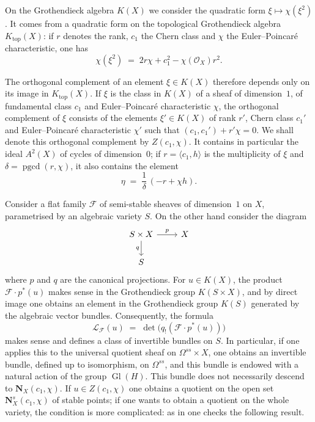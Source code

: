 \documentclass[12pt,english]{smfart}%
\theoremstyle{plain}
\theoremstyle{definition}
\theoremstyle{remark}
\newcommand{\Oh}{\mathcal{O}}
\DeclareMathOperator{\Gl}{Gl}
\newcommand{\gcdd}{\operatorname{pgcd}}
\newcommand{\origpage}[1]{\marginnote{\scriptsize\itshape p.~#1}}
\begin{document}
On the Grothendieck algebra $K(X)$ we consider the quadratic form $\xi\mapsto\chi(\xi^{2})$. It comes from a quadratic form on the topological Grothendieck algebra $K_{\mathrm{top}}(X)$: if $r$ denotes the rank, $c_{1}$ the Chern class and $\chi$ the Euler--Poincar\'e characteristic, one has
\[
\chi(\xi^{2}) \;=\; 2r\chi + c_{1}^{2} - \chi(\Oh_{X})r^{2}.
\]

The orthogonal complement of an element $\xi\in K(X)$ therefore depends only on its image in $K_{\mathrm{top}}(X)$. If $\xi$ is the class in $K(X)$ of a sheaf of dimension~$1$, of fundamental class $c_{1}$ and Euler--Poincar\'e characteristic $\chi$, the orthogonal complement of $\xi$ consists of the elements $\xi'\in K(X)$ of rank $r'$, Chern class $c_{1}'$ and Euler--Poincar\'e characteristic $\chi'$ such that $(c_{1},c_{1}')+r'\chi=0$. We shall denote this orthogonal complement by $Z(c_{1},\chi)$. It contains in particular the ideal $A^{2}(X)$ of cycles of dimension~$0$; if $r=\langle c_{1},h\rangle$ is the multiplicity of $\xi$ and $\delta=\gcdd(r,\chi)$, it also contains the element
\[
\eta \;=\; \frac{1}{\delta}\,(-r + \chi h).
\]

Consider a flat family $\mathscr{F}$ of semi-stable sheaves of dimension~$1$ on $X$, parametrised by an algebraic variety $S$. On the other hand consider the diagram
\[
\begin{tikzcd}
S\times X \arrow[r,"p"] \arrow[d,"q"'] & X \\
S &
\end{tikzcd}
\]
where $p$ and $q$ are the canonical projections. For $u\in K(X)$, the product $\mathscr{F}\cdot p^{*}(u)$ makes sense in the Grothendieck group $K(S\times X)$, and by direct image one obtains an element in the Grothendieck group $K(S)$ generated by the algebraic vector bundles. Consequently, the formula
\[
\mathscr{L}_{\mathscr{F}}(u) \;=\; \det\bigl(q_{!}(\mathscr{F}\cdot p^{*}(u))\bigr)
\]
makes sense and defines a class of invertible bundles on $S$. In particular, if one applies this to the universal quotient sheaf on $\Omega^{ss}\times X$, one obtains an invertible bundle, defined up to isomorphism, on $\Omega^{ss}$, and this bundle is endowed with a natural action of the group $\Gl(H)$. This bundle does not necessarily descend to $\mathbf{N}_{X}(c_{1},\chi)$. If $u\in Z(c_{1},\chi)$ one obtains a quotient on
\origpage{643}%
the open set $\mathbf{N}^{s}_{X}(c_{1},\chi)$ of stable points; if one wants to obtain a quotient on the whole variety, the condition is more complicated: as in \cite{LeP5} one checks the following result.
\end{document}
